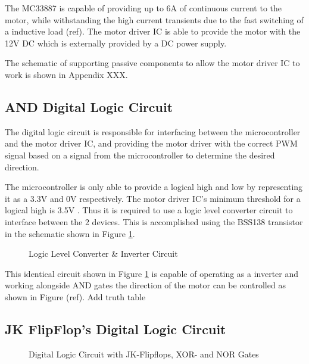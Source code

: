 \documentclass[a4paper,12pt]{article}
\begin{document}
	The MC33887 is capable of providing up to 6A of continuous current to the motor, while withstanding the high current transients due to the fast switching of a inductive load (ref). The motor driver IC is able to provide the motor with the 12V DC which is externally provided by a DC power supply.
	
	The schematic of supporting passive components to allow the motor driver IC to work is shown in Appendix XXX.
	
	\subsection{AND Digital Logic Circuit}
	
	The digital logic circuit is responsible for interfacing between the microcontroller and the motor driver IC, and providing the motor driver with the correct PWM signal based on a signal from the microcontroller to determine the desired direction.
	
	The microcontroller is only able to provide a logical high and low by representing it as a 3.3V and 0V respectively. The motor driver IC's minimum threshold for a logical high is 3.5V \cite{motorIC}. Thus it is required to use a logic level converter circuit to interface between the 2 devices. This is accomplished using the BSS138 transistor in the schematic shown in Figure \ref{fig:interterCirc}. 
	
	\begin{figure}[h]
		\centering
		
		\caption{Logic Level Converter \& Inverter Circuit}
		\label{fig:interterCirc}
	\end{figure}
	
	This identical circuit shown in Figure \ref{fig:interterCirc} is capable of operating as a inverter and working alongside AND gates the direction of the motor can be controlled as shown in Figure (ref). Add truth table
	
	\subsection{JK FlipFlop's Digital Logic Circuit}
	
	\begin{figure}[h]
		\centering
		
		\caption{Digital Logic Circuit with JK-Flipflops, XOR- and NOR Gates}
		\label{fig:jk_xor}
	\end{figure}
	
\end{document}
